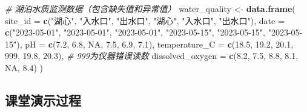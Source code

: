 \documentclass[
]{book}
\newenvironment{Shaded}{\begin{snugshade}}{\end{snugshade}}
\newcommand{\AttributeTok}[1]{\textcolor[rgb]{0.13,0.29,0.53}{#1}}
\newcommand{\CommentTok}[1]{\textcolor[rgb]{0.56,0.35,0.01}{\textit{#1}}}
\newcommand{\ConstantTok}[1]{\textcolor[rgb]{0.56,0.35,0.01}{#1}}
\newcommand{\DecValTok}[1]{\textcolor[rgb]{0.00,0.00,0.81}{#1}}
\newcommand{\FloatTok}[1]{\textcolor[rgb]{0.00,0.00,0.81}{#1}}
\newcommand{\FunctionTok}[1]{\textcolor[rgb]{0.13,0.29,0.53}{\textbf{#1}}}
\newcommand{\NormalTok}[1]{#1}
\newcommand{\OtherTok}[1]{\textcolor[rgb]{0.56,0.35,0.01}{#1}}
\newcommand{\StringTok}[1]{\textcolor[rgb]{0.31,0.60,0.02}{#1}}
\begin{document}
\begin{Shaded}
\begin{Highlighting}[]
\CommentTok{\# 湖泊水质监测数据（包含缺失值和异常值）}
\NormalTok{water\_quality }\OtherTok{\textless{}{-}} \FunctionTok{data.frame}\NormalTok{(}
  \AttributeTok{site\_id =} \FunctionTok{c}\NormalTok{(}\StringTok{"湖心"}\NormalTok{, }\StringTok{"入水口"}\NormalTok{, }\StringTok{"出水口"}\NormalTok{, }\StringTok{"湖心"}\NormalTok{, }\StringTok{"入水口"}\NormalTok{, }\StringTok{"出水口"}\NormalTok{),}
  \AttributeTok{date =} \FunctionTok{c}\NormalTok{(}\StringTok{"2023{-}05{-}01"}\NormalTok{, }\StringTok{"2023{-}05{-}01"}\NormalTok{, }\StringTok{"2023{-}05{-}01"}\NormalTok{, }\StringTok{"2023{-}05{-}15"}\NormalTok{, }\StringTok{"2023{-}05{-}15"}\NormalTok{, }\StringTok{"2023{-}05{-}15"}\NormalTok{),}
  \AttributeTok{pH =} \FunctionTok{c}\NormalTok{(}\FloatTok{7.2}\NormalTok{, }\FloatTok{6.8}\NormalTok{, }\ConstantTok{NA}\NormalTok{, }\FloatTok{7.5}\NormalTok{, }\FloatTok{6.9}\NormalTok{, }\FloatTok{7.1}\NormalTok{),}
  \AttributeTok{temperature\_C =} \FunctionTok{c}\NormalTok{(}\FloatTok{18.5}\NormalTok{, }\FloatTok{19.2}\NormalTok{, }\FloatTok{20.1}\NormalTok{, }\DecValTok{999}\NormalTok{, }\FloatTok{19.8}\NormalTok{, }\FloatTok{20.3}\NormalTok{),  }\CommentTok{\# 999为仪器错误读数}
  \AttributeTok{dissolved\_oxygen =} \FunctionTok{c}\NormalTok{(}\FloatTok{8.2}\NormalTok{, }\FloatTok{7.5}\NormalTok{, }\FloatTok{8.8}\NormalTok{, }\FloatTok{8.1}\NormalTok{, }\ConstantTok{NA}\NormalTok{, }\FloatTok{8.4}\NormalTok{)}
\NormalTok{)}
\end{Highlighting}
\end{Shaded}

\hypertarget{ux8bfeux5802ux6f14ux793aux8fc7ux7a0b-5}{%
\subsection{课堂演示过程}\label{ux8bfeux5802ux6f14ux793aux8fc7ux7a0b-5}}
\end{document}
